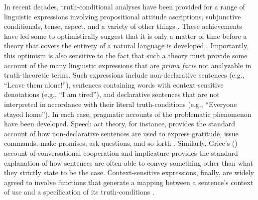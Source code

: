 In recent decades, truth-conditional analyses have been provided for a range of linguistic expressions involving propositional attitude ascriptions, subjunctive conditionals, tense, aspect, and a variety of other things \citep{Carpenter:1997,Soames:2010,Stanley:2008,Speaks:2014}. These achievements have led some to optimistically suggest that it is only a matter of time before a theory that covers the entirety of a natural language is developed \citep[e.g.,][]{Soames:2010}. Importantly, this optimism is also sensitive to the fact that such a theory must provide some account of the many linguistic expressions that are \textit{prima facie} not analyzable in truth-theoretic terms. Such expressions include non-declarative sentences (e.g., ``Leave them alone!''), sentences containing words with context-sensitive denotations (e.g., ``I am tired''), and declarative sentences that are not interpreted in accordance with their literal truth-conditions (e.g., ``Everyone stayed home''). In each case, pragmatic accounts of the problematic phenomenon have been developed. Speech act theory, for instance, provides the standard account of how non-declarative sentences are used to express gratitude, issue commands, make promises, ask questions, and so forth \citep{Austin:1962,Searle:1969}. Similarly, Grice's (\citeyear{Grice:1975}) account of conversational cooperation and implicature provides the standard explanation of how sentences are often able to convey something other than what they strictly state to be the case. Context-sensitive expressions, finally, are widely agreed to involve functions that generate a mapping between a sentence's context of use and a specification of its truth-conditions \citep{Soames:2010,Recanati:2012,Recanati:2004,CappelenLepore:2005}. 

